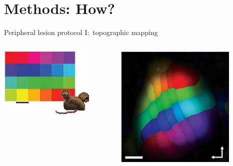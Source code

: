 \section{Methods: How?}
\begin{frame}[c]{Peripheral lesion protocol I:\ topographic mapping}
  \begin{columns}
    \begin{column}{0.5\textwidth}
      \centering
      \includegraphics[width=0.8\textwidth]{99_images/keck-1-1a}%
    \end{column}
    \begin{column}{0.5\textwidth}
      \centering
      \includegraphics[width=0.8\textwidth]{99_images/keck-1-1c}%
    \end{column}
  \end{columns}
\end{frame}

